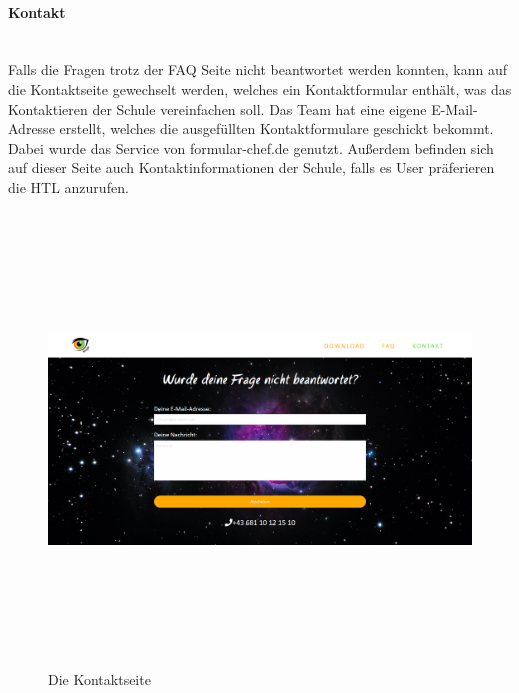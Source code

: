 \paragraph{Kontakt} \leavevmode \\
Falls die Fragen trotz der FAQ Seite nicht beantwortet werden konnten, kann auf die Kontaktseite gewechselt werden, welches ein Kontaktformular enthält, was das Kontaktieren der Schule vereinfachen soll.
Das Team hat eine eigene E-Mail-Adresse erstellt, welches die ausgefüllten Kontaktformulare geschickt bekommt. Dabei wurde das Service von formular-chef.de genutzt. Außerdem befinden sich auf dieser Seite auch Kontaktinformationen der Schule, falls es User präferieren die HTL anzurufen.
\begin{figure}[H]
	\centering				\includegraphics[width=12cm,height=12cm,keepaspectratio]{webseite_abb7} 
	\caption{Die Kontaktseite}
\end{figure}
